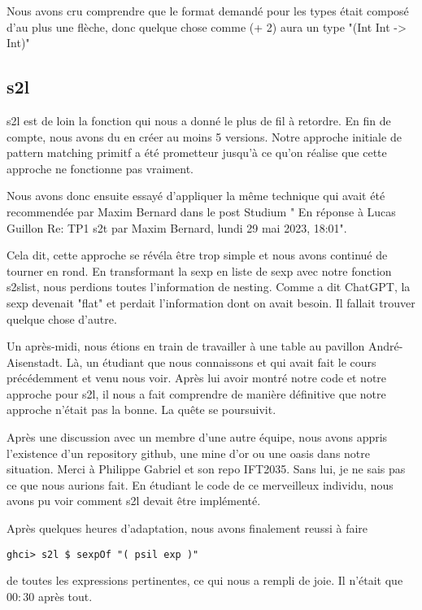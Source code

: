 \documentclass{article}
\begin{document}
Nous avons cru comprendre que le format demandé pour les types était composé d'au plus une flèche, donc quelque chose comme (+ 2) aura un type "(Int Int -> Int)"

\subsection{s2l}
s2l est de loin la fonction qui nous a donné le plus de fil à retordre. En fin de compte, nous avons du en créer au moins 5 versions. Notre approche initiale de pattern matching primitf a été prometteur jusqu'à ce qu'on réalise que cette approche ne fonctionne pas vraiment. 

Nous avons donc ensuite essayé d'appliquer la même technique qui avait été recommendée par Maxim Bernard dans le post Studium " En réponse à Lucas Guillon Re: TP1 s2t par Maxim Bernard, lundi 29 mai 2023, 18:01".

Cela dit, cette approche se révéla être trop simple et nous avons continué de tourner en rond. En transformant la sexp en liste de sexp avec notre fonction s2slist, nous perdions toutes l'information de nesting. Comme a dit ChatGPT, la sexp devenait "flat" et perdait l'information dont on avait besoin. Il fallait trouver quelque chose d'autre. 

Un après-midi, nous étions en train de travailler à une table au pavillon André-Aisenstadt. Là, un étudiant que nous connaissons et qui avait fait le cours précédemment et venu nous voir. Après lui avoir montré notre code et notre approche pour s2l, il nous a fait comprendre de manière définitive que notre approche n'était pas la bonne. La quête se poursuivit.

Après une discussion avec un membre d'une autre équipe, nous avons appris l'existence d'un repository github, une mine d'or ou une oasis dans notre situation. Merci à Philippe Gabriel et son repo IFT2035. Sans lui, je ne sais pas ce que nous aurions fait. En étudiant le code de ce merveilleux individu, nous avons pu voir comment s2l devait être implémenté. 

Après quelques heures d'adaptation, nous avons finalement reussi à faire 
\begin{verbatim}
ghci> s2l $ sexpOf "( psil exp )"
\end{verbatim}

de toutes les expressions pertinentes, ce qui nous a rempli de joie. Il n'était que $00:30$ après tout.
\end{document}
